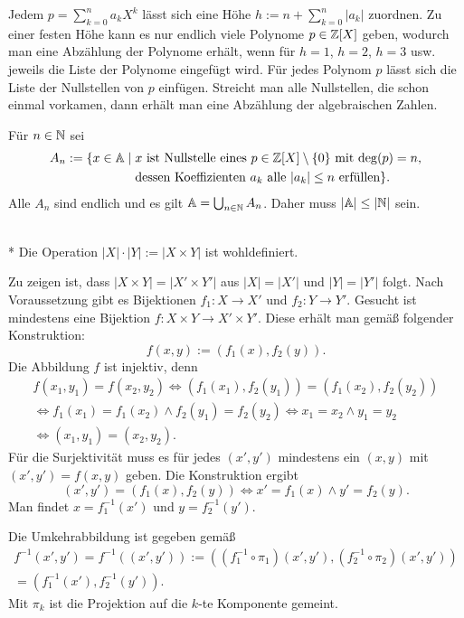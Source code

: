 \begin{Beweis}[Beweis 2]
Jedem $p=\sum_{k=0}^n a_kX^k$ lässt sich eine Höhe
$h:=n+\sum_{k=0}^n |a_k|$ zuordnen. Zu einer festen Höhe kann es nur
endlich viele Polynome $p\in\mathbb Z[X]$ geben, wodurch man eine Abzählung der
Polynome erhält, wenn für $h=1$, $h=2$, $h=3$ usw. jeweils die Liste
der Polynome eingefügt wird. Für jedes Polynom $p$ lässt sich die
Liste der Nullstellen von $p$ einfügen. Streicht man alle Nullstellen,
die schon einmal vorkamen, dann erhält man eine Abzählung der
algebraischen Zahlen.\,\qedsymbol
\end{Beweis}

\begin{Beweis}[Beweis 3]
Für $n\in\mathbb N$ sei
\[\begin{split}
A_n := \{x\in\mathbb A\mid \;&\text{$x$ ist Nullstelle eines
$p\in\mathbb Z[X]\setminus\{0\}$ mit $\deg(p)=n$,}\\
& \text{dessen Koeffizienten $a_k$ alle $|a_k|\le n$
erfüllen}\}.
\end{split}\]
Alle $A_n$ sind endlich und es gilt $\mathbb A=\bigcup_{n\in\mathbb N} A_n$.
Daher muss $|\mathbb A|\le |\mathbb N|$ sein.\,\qedsymbol
\end{Beweis}

\begin{Definition}\mbox{}\\*
Die Operation $|X|\cdot |Y|:=|X\times Y|$ ist wohldefiniert.
\end{Definition}
\begin{Beweis}
Zu zeigen ist, dass $|X\times Y|=|X'\times Y'|$
aus $|X|=|X'|$ und $|Y|=|Y'|$ folgt. Nach Voraussetzung gibt
es Bijektionen $f_1\colon X\to X'$ und $f_2\colon Y\to Y'$. Gesucht
ist mindestens eine Bijektion $f\colon X\times Y\to X'\times Y'$.
Diese erhält man gemäß folgender Konstruktion:
\[f(x,y) := (f_1(x),f_2(y)).\]
Die Abbildung $f$ ist injektiv, denn
\begin{gather*}
f(x_1,y_1)=f(x_2,y_2) \iff (f_1(x_1),f_2(y_1))=(f_1(x_2),f_2(y_2))\\
\iff f_1(x_1)=f_1(x_2)\land f_2(y_1)=f_2(y_2)\iff x_1=x_2\land y_1=y_2\\
\iff (x_1,y_1)=(x_2,y_2).
\end{gather*}
Für die Surjektivität muss es für jedes $(x',y')$ mindestens
ein $(x,y)$ mit $(x',y')=f(x,y)$ geben. Die Konstruktion ergibt
\[(x',y')=(f_1(x),f_2(y))\iff x'=f_1(x)\land y'=f_2(y).\]
Man findet $x=f_1^{-1}(x')$ und $y=f_2^{-1}(y')$.

Die Umkehrabbildung ist gegeben gemäß
\begin{gather*}
f^{-1}(x',y')=f^{-1}((x',y')):=((f_1^{-1}\circ\pi_1)(x',y'),(f_2^{-1}\circ\pi_2)(x',y'))\\
= (f_1^{-1}(x'),f_2^{-1}(y')).
\end{gather*}
Mit $\pi_k$ ist die Projektion auf die $k$-te Komponente gemeint.\;\qedsymbol
\end{Beweis}

